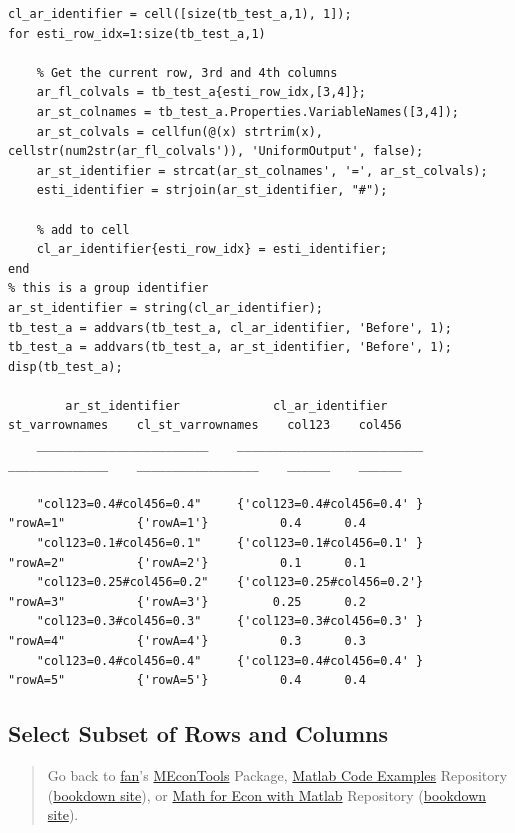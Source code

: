 \documentclass[
]{book}
\begin{document}
\begin{verbatim}
cl_ar_identifier = cell([size(tb_test_a,1), 1]);
for esti_row_idx=1:size(tb_test_a,1)
    
    % Get the current row, 3rd and 4th columns
    ar_fl_colvals = tb_test_a{esti_row_idx,[3,4]};
    ar_st_colnames = tb_test_a.Properties.VariableNames([3,4]);
    ar_st_colvals = cellfun(@(x) strtrim(x), cellstr(num2str(ar_fl_colvals')), 'UniformOutput', false);
    ar_st_identifier = strcat(ar_st_colnames', '=', ar_st_colvals);
    esti_identifier = strjoin(ar_st_identifier, "#");
    
    % add to cell
    cl_ar_identifier{esti_row_idx} = esti_identifier;
end
% this is a group identifier
ar_st_identifier = string(cl_ar_identifier);
tb_test_a = addvars(tb_test_a, cl_ar_identifier, 'Before', 1);
tb_test_a = addvars(tb_test_a, ar_st_identifier, 'Before', 1);
disp(tb_test_a);

        ar_st_identifier             cl_ar_identifier         st_varrownames    cl_st_varrownames    col123    col456
    ________________________    __________________________    ______________    _________________    ______    ______

    "col123=0.4#col456=0.4"     {'col123=0.4#col456=0.4' }       "rowA=1"          {'rowA=1'}          0.4      0.4  
    "col123=0.1#col456=0.1"     {'col123=0.1#col456=0.1' }       "rowA=2"          {'rowA=2'}          0.1      0.1  
    "col123=0.25#col456=0.2"    {'col123=0.25#col456=0.2'}       "rowA=3"          {'rowA=3'}         0.25      0.2  
    "col123=0.3#col456=0.3"     {'col123=0.3#col456=0.3' }       "rowA=4"          {'rowA=4'}          0.3      0.3  
    "col123=0.4#col456=0.4"     {'col123=0.4#col456=0.4' }       "rowA=5"          {'rowA=5'}          0.4      0.4  
\end{verbatim}

\hypertarget{select-subset-of-rows-and-columns}{%
\subsection{Select Subset of Rows and Columns}\label{select-subset-of-rows-and-columns}}

\begin{quote}
Go back to \href{http://fanwangecon.github.io/}{fan}'s \href{https://fanwangecon.github.io/MEconTools/}{MEconTools} Package, \href{https://fanwangecon.github.io/M4Econ/}{Matlab Code Examples} Repository (\href{https://fanwangecon.github.io/M4Econ/bookdown}{bookdown site}), or \href{https://fanwangecon.github.io/Math4Econ/}{Math for Econ with Matlab} Repository (\href{https://fanwangecon.github.io/Math4Econ/bookdown}{bookdown site}).
\end{quote}
\end{document}
